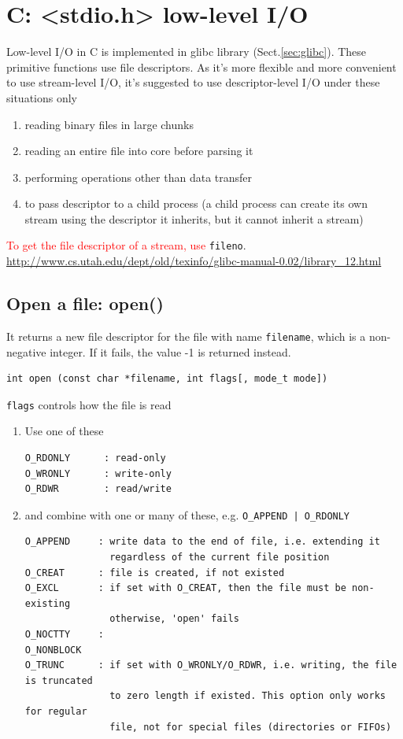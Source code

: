 \section{C: <stdio.h> low-level I/O }
\label{sec:IO_low-level-C}

Low-level I/O in C is implemented in glibc library (Sect.\ref{sec:glibc}). These
primitive functions use file descriptors. As it's more flexible and more
convenient to use stream-level I/O, it's suggested to use descriptor-level I/O
under these situations only
\begin{enumerate}
  \item reading binary files in large chunks
  \item reading an entire file into core before parsing it
  \item performing operations other than data transfer
  \item to pass descriptor to a child process (a child process can create its
  own stream using the descriptor it inherits, but it cannot inherit a stream)
\end{enumerate}
\textcolor{red}{To get the file descriptor of a stream, use }\verb!fileno!.
\url{http://www.cs.utah.edu/dept/old/texinfo/glibc-manual-0.02/library_12.html}

\subsection{Open a file: open()}

It returns a new file descriptor for the file with name \verb!filename!, which
is a non-negative integer. If it fails, the value -1 is returned instead.
\begin{verbatim}
int open (const char *filename, int flags[, mode_t mode])
\end{verbatim}
\verb!flags! controls how the file is read
\begin{enumerate}
  \item Use one of these
\begin{verbatim}
O_RDONLY      : read-only
O_WRONLY      : write-only
O_RDWR        : read/write

\end{verbatim}

  \item and combine with one or many of these, e.g. \verb!O_APPEND | O_RDONLY!
\begin{verbatim}
O_APPEND     : write data to the end of file, i.e. extending it
               regardless of the current file position
O_CREAT      : file is created, if not existed
O_EXCL       : if set with O_CREAT, then the file must be non-existing
               otherwise, 'open' fails
O_NOCTTY     : 
O_NONBLOCK
O_TRUNC      : if set with O_WRONLY/O_RDWR, i.e. writing, the file is truncated
               to zero length if existed. This option only works for regular
               file, not for special files (directories or FIFOs)
\end{verbatim}
\end{enumerate}


